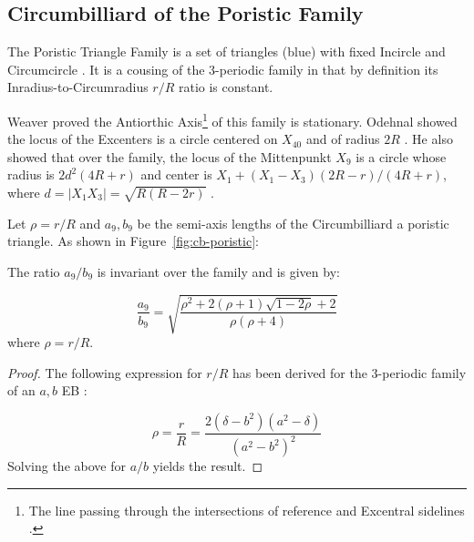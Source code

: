 \subsection{Circumbilliard of the Poristic Family}

The Poristic Triangle Family is a set of triangles (blue) with fixed Incircle and Circumcircle \cite{gallatly1914-geometry}. It is a cousing of the 3-periodic family in that by definition its Inradius-to-Circumradius $r/R$ ratio is constant.

Weaver \cite{weaver1927-poristic} proved the Antiorthic Axis\footnote{The line passing through the intersections of reference and Excentral sidelines \cite{mw}.} of this family is stationary. Odehnal showed the locus of the Excenters is a circle centered on $X_{40}$ and of radius $2R$ \cite{odehnal2011-poristic}. He also showed that over the family, the locus of the Mittenpunkt $X_9$ is a circle whose radius is $2{d^2}(4R+r)$ and center is $X_1 + (X_1 - X_3) (2 R - r)/(4 R + r)$, where $d=|X_1X_3|=\sqrt{R(R-2{r})}$ \cite[page 17]{odehnal2011-poristic}.

Let $\rho=r/R$ and $a_9,b_9$ be the semi-axis lengths of the Circumbilliard a poristic triangle. As shown in Figure~\ref{fig:cb-poristic}:

\begin{theorem}
The ratio $a_9/b_9$ is invariant over the family and is given by:

\begin{equation*}
\frac{a_9}{b_9}=\sqrt{\frac{\rho^2+2 (\rho+1)\sqrt{1-2\rho} +2}{\rho (\rho+4)}}
\end{equation*}
\noindent where $\rho=r/R$.
\label{thm:poristic}
\end{theorem}

\begin{proof}
The following expression for $r/R$ has been derived for the 3-periodic family of an $a,b$ EB \cite[Equation 7]{garcia2020-new-properties}:

\begin{equation}
  \rho = \frac{r}{R} =  \frac{2(\delta-b^2)(a^2-\delta)}{ (a^2-b^2)^2}
\end{equation}
Solving the above for $a/b$ yields the result.
\end{proof}


